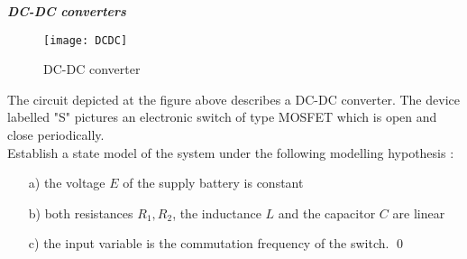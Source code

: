 \begin{exercice}{\bf \em DC-DC converters}

\begin{figure}[htbp]
\begin{center}
\texttt{[image: DCDC]}
\caption{DC-DC converter}
\label{fig:DCDC}
\end{center}
\end{figure}
The circuit depicted at the figure above describes a DC-DC converter.  
The device labelled "S" pictures an electronic switch of type MOSFET 
which is open and close periodically.\\

Establish a state model of the system under the following modelling 
hypothesis :
\begin{itemize}
\item[a)] the voltage $E$ of the supply battery is constant
\item[b)] both resistances $R_1, R_2$, the inductance $L$ and the 
capacitor $C$ are linear
\item[c)] the input variable is the commutation frequency of the switch. \qed
\end{itemize} 
\end{exercice}




